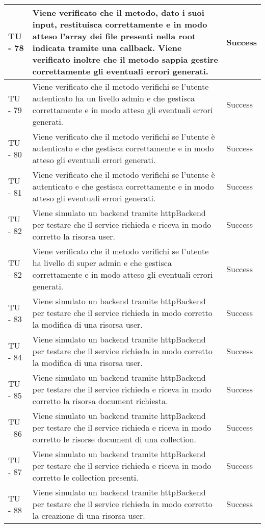 \begin{center}
\begin{longtable}{ | p{3cm} | p{9cm} | p{2cm} | }
TU - 78 & Viene verificato che il metodo, dato i suoi input, restituisca correttamente e in modo atteso l'array dei file presenti nella root indicata tramite una callback. Viene verificato inoltre che il metodo sappia gestire correttamente gli eventuali errori generati. & Success \\ \hline
TU - 79 & Viene verificato che il metodo verifichi se l'utente autenticato ha un livello admin e che gestisca correttamente e in modo atteso gli eventuali errori generati. & Success \\ \hline
TU - 80 & Viene verificato che il metodo verifichi se l'utente è autenticato e che gestisca correttamente e in modo atteso gli eventuali errori generati. & Success \\ \hline
TU - 81 & Viene verificato che il metodo verifichi se l'utente è autenticato e che gestisca correttamente e in modo atteso gli eventuali errori generati. & Success \\ \hline
TU - 82 & Viene simulato un backend tramite httpBackend per testare che il service richieda e riceva in modo corretto la risorsa user. & Success \\ \hline
TU - 82 & Viene verificato che il metodo verifichi se l'utente ha livello di super admin e che gestisca correttamente e in modo atteso gli eventuali errori generati. & Success \\ \hline
TU - 83 & Viene simulato un backend tramite httpBackend per testare che il service richieda in modo corretto la modifica di una risorsa user. & Success \\ \hline
TU - 84 & Viene simulato un backend tramite httpBackend per testare che il service richieda in modo corretto la modifica di una risorsa user. & Success \\ \hline
TU - 85 & Viene simulato un backend tramite httpBackend per testare che il service richieda e riceva in modo corretto la risorsa document richiesta. & Success \\ \hline
TU - 86 & Viene simulato un backend tramite httpBackend per testare che il service richieda e riceva in modo corretto le risorse document di una collection. & Success \\ \hline
TU - 87 & Viene simulato un backend tramite httpBackend per testare che il service richieda e riceva in modo corretto le collection presenti. & Success \\ \hline
TU - 88 & Viene simulato un backend tramite httpBackend per testare che il service richieda in modo corretto la creazione di una risorsa user. & Success \\ \hline

\end{longtable}
\end{center}
